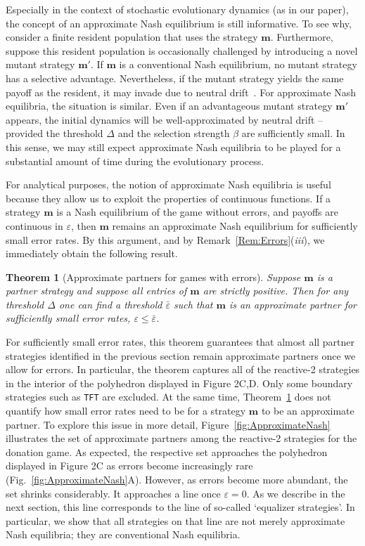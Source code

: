 \documentclass[9pt,twoside,lineno]{pnas-new}
\theoremstyle{plainCl1}
\newtheorem{theorem}{Theorem}
\theoremstyle{plainCl2}
\def\tft{\texttt{TFT}}
\begin{document}
Especially in the context of stochastic evolutionary dynamics (as in our paper), the concept of an approximate Nash equilibrium is still informative. 
To see why, consider a finite resident population that uses the strategy $\mathbf{m}$. 
Furthermore, suppose this resident population is occasionally challenged by introducing a novel mutant strategy $\mathbf{m'}$. 
If $\mathbf{m}$ is a conventional Nash equilibrium, no mutant strategy has a selective advantage. 
Nevertheless, if the mutant strategy yields the same payoff as the resident, it may invade due to neutral drift~\citep{garcia:jet:2016}. 
For approximate Nash equilibria, the situation is similar. 
Even if an advantageous mutant strategy $\mathbf{m'}$ appears, the initial dynamics will be well-approximated by neutral drift -- provided the threshold $\Delta$ and the selection strength $\beta$ are sufficiently small. 
In this sense, we may still expect approximate Nash equilibria to be played for a substantial amount of time during the evolutionary process. 

For analytical purposes, the notion of approximate Nash equilibria is useful because they allow us to exploit the properties of continuous functions. 
If a strategy $\mathbf{m}$ is a Nash equilibrium of the game without errors, and payoffs are continuous in $\varepsilon$, then $\mathbf{m}$ remains an approximate Nash equilibrium for sufficiently small error rates. By this argument, and by Remark~\ref{Rem:Errors}({\it iii}), we immediately obtain the following result. 

\begin{theorem}[Approximate partners for games with errors] \label{Thm:ApproxPartners}
Suppose $\mathbf{m}$ is a partner strategy and suppose all entries of $\mathbf{m}$ are strictly positive. 
Then for any threshold $\Delta$ one can find a threshold $\bar{\varepsilon}$ such that $\mathbf{m}$ is an approximate partner for sufficiently small error rates, $\varepsilon\!\le\!\bar{\varepsilon}$. 
\end{theorem}

For sufficiently small error rates, this theorem guarantees that almost all partner strategies identified in the previous section remain approximate partners once we allow for errors. 
In particular, the theorem captures all of the reactive-2 strategies in the interior of the polyhedron displayed in Figure 2C,D.
Only some boundary strategies such as \tft{} are excluded. 
At the same time, Theorem~\ref{Thm:ApproxPartners} does not quantify how small error rates need to be for a strategy $\mathbf{m}$ to be an approximate partner. 
To explore this issue in more detail, Figure~\ref{fig:ApproximateNash} illustrates the set of approximate partners among the reactive-2 strategies for the donation game. 
As expected, the respective set approaches the polyhedron displayed in Figure 2C as errors become increasingly rare (Fig.~\ref{fig:ApproximateNash}A). 
However, as errors become more abundant, the set shrinks considerably. 
It approaches a line once $\varepsilon\!=\!0$. 
As we describe in the next section, this line corresponds to the line of so-called `equalizer strategies'. 
In particular, we show that all strategies on that line are not merely approximate Nash equilibria; they are conventional Nash equilibria. 
\end{document}

